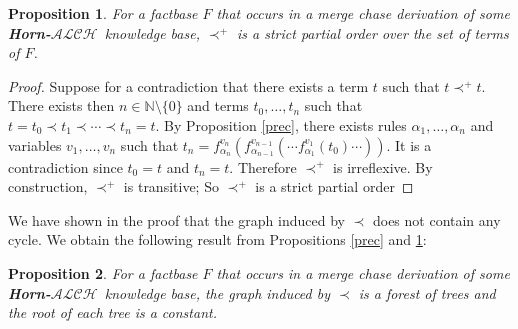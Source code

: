 \documentclass{article}
\newtheorem{proposition}{Proposition}[section]
\theoremstyle{definition}
\newtheorem{definition}{Definition}[section]
\theoremstyle{remark}
\def \N {\mathbb N}
\newcommand{\ALCH}{\textbf{Horn-$\mathcal{ALCH}$}}
\begin{document}
\begin{proposition} \label{partial_order}
For a factbase $F$ that occurs in a merge chase derivation of some \ALCH\ knowledge base, $\prec^+$ is a strict partial order over the set of terms of $F$.
\end{proposition}

\begin{proof}
Suppose for a contradiction that there exists a term $t$ such that $t \prec^+ t$. There exists then $n \in \N \setminus \{0\}$ and terms $t_0,\ldots,t_n$ such that $t=t_0 \prec t_1 \prec \cdots \prec t_n = t$. By Proposition \ref{prec}, there exists rules $\alpha_1,\ldots, \alpha_n$ and variables $v_1,\ldots,v_n$ such that $t_n = f_{\alpha_n}^{v_n}(f_{\alpha_{n-1}}^{v_{n-1}}(\cdots f_{\alpha_1}^{v_1}(t_0)\cdots))$. It is a contradiction since $t_0 = t$ and $t_n=t$. Therefore $\prec^+$ is irreflexive. By construction, $\prec^+$ is transitive; So $\prec^+$ is a strict partial order
\end{proof}

We have shown in the proof that the graph induced by $\prec$ does not contain any cycle. We obtain the following result from Propositions \ref{prec} and \ref{partial_order}:

\begin{proposition}
For a factbase $F$ that occurs in a merge chase derivation of some \ALCH\ knowledge base, the graph induced by $\prec$ is a forest of trees and the root of each tree is a constant.
\end{proposition}




%






\end{document}
